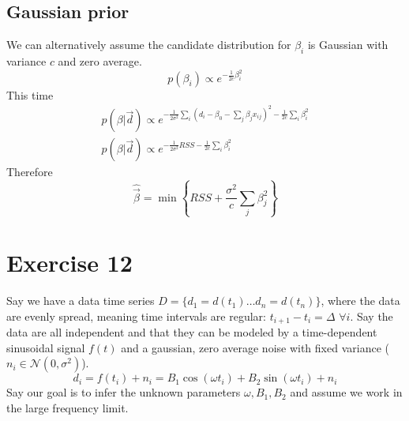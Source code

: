 \documentclass[a4paper,11pt,fleqn]{article}
\begin{document}
\subsection{Gaussian prior}
We can alternatively assume the candidate distribution for $\beta_i$ is 
Gaussian with variance $c$ and zero average.
\begin{equation}
    p(\beta_i) \propto e^{-\frac{1}{2c} \beta_i^2}
\end{equation}
This time
\begin{gather*}
    p(\beta |\vec{d}) \propto e^{-\frac{1}{2\sigma^2}\sum_i (d_i-\beta_0-\sum_j \beta_j x_{ij})^2-\frac{1}{2c}\sum_i \beta_i^2} \\
    p(\beta |\vec{d}) \propto e^{-\frac{1}{2\sigma^2} RSS -\frac{1}{2c}\sum_i \beta_i^2}
\end{gather*}
Therefore 
\begin{equation}
    \hat{\vec{\beta}} = \min{\left\{RSS + \frac{\sigma^2}{c}\sum_j \beta_j^2\right\}}
\end{equation}



\section{Exercise 12}
Say we have a data time series $D=\{d_1=d(t_1)\dotsc d_n=d(t_n)\}$, where 
the data are evenly spread, meaning time intervals are regular: 
$t_{i+1}-t_i = \Delta$ $ \forall i$. Say the data are all independent and 
that they can be modeled by a time-dependent sinusoidal signal $f(t)$ and 
a gaussian, zero average noise with fixed variance ( $n_i \in \mathcal{N}(0,\sigma^2)$).
\begin{equation}
    d_i = f(t_i)+n_i = B_1\cos(\omega t_i) + B_2 \sin(\omega t_i) + n_i
\end{equation}
Say our goal is to infer the unknown parameters $\omega, B_1, B_2$ and 
assume we work in the large frequency limit.
\end{document}
